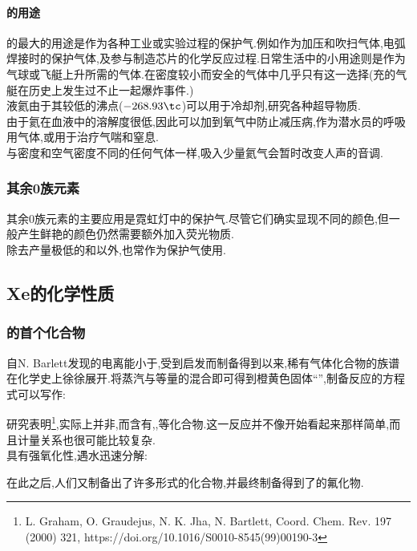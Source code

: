 \documentclass{ctexart}
\begin{document}
\paragraph{的用途}
\indent {}的最大的用途是作为各种工业或实验过程的保护气.例如作为加压和吹扫气体,电弧焊接时的保护气体,及参与制造芯片的化学反应过程.日常生活中的小用途则是作为气球或飞艇上升所需的气体.在密度较小而安全的气体中几乎只有这一选择(充的气艇在历史上发生过不止一起爆炸事件.)\\
\indent 液氦由于其较低的沸点($-268.93\tc$)可以用于冷却剂,研究各种超导物质.\\
\indent 由于氦在血液中的溶解度很低,因此可以加到氧气中防止减压病,作为潜水员的呼吸用气体,或用于治疗气喘和窒息.\\
\indent 与密度和空气密度不同的任何气体一样,吸入少量氦气会暂时改变人声的音调.
\subsubsection{其余0族元素}
其余0族元素的主要应用是霓虹灯中的保护气.尽管它们确实显现不同的颜色,但一般产生鲜艳的颜色仍然需要额外加入荧光物质.\\
\indent 除去产量极低的和以外,也常作为保护气使用.
\subsection{Xe的化学性质}
\subsubsection{的首个化合物}
自N. Barlett发现的电离能小于,受到启发而制备得到以来,稀有气体化合物的族谱在化学史上徐徐展开.将蒸汽与等量的混合即可得到橙黄色固体“”,制备反应的方程式可以写作:
\begin{center}
\end{center}
\indent 研究表明\footnote{L. Graham, O. Graudejus, N. K. Jha, N. Bartlett, Coord. Chem. Rev. 197 (2000) 321, https://doi.org/10.1016/S0010-8545(99)00190-3},实际上并非\ce{[Xe]+[PtF6]-},而含有\ce{[XeF]+[PtF6]-},\ce{[XeF]+[Pt2F11]-},\ce{[Xe2F3]+[PtF6]-}等化合物.这一反应并不像开始看起来那样简单,而且计量关系也很可能比较复杂.\\
\indent {}具有强氧化性,遇水迅速分解:
\begin{center}
\end{center}
在此之后,人们又制备出了许多形式的化合物,并最终制备得到了的氟化物.
\end{document}
